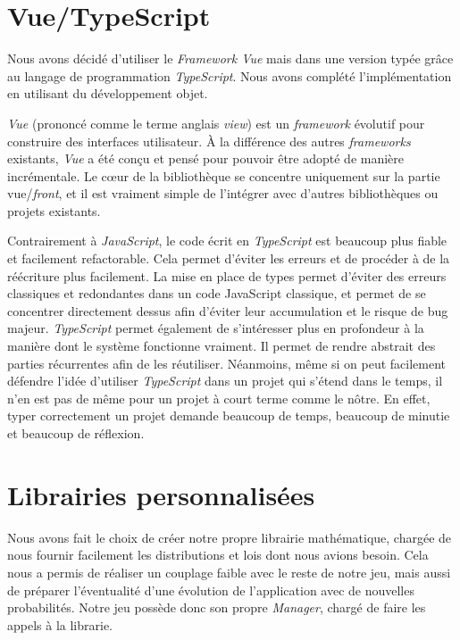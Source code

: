 \documentclass[a4paper, 12pt]{report}
\begin{document}
\section{Vue/TypeScript}

\tabto{1cm}Nous avons décidé d'utiliser le \textit{Framework Vue} mais dans une version typée grâce au
langage de programmation \textit{TypeScript}. Nous avons complété l'implémentation en utilisant du développement objet.

\vspace{0.5cm}

\tabto{1cm} \textit{Vue} (prononcé comme le terme anglais \textit{view}) est un \textit{framework} évolutif pour construire des
interfaces utilisateur. À la différence des autres \textit{frameworks} existants, \textit{Vue} a été conçu et pensé
pour pouvoir être adopté de manière incrémentale. Le cœur de la bibliothèque se concentre uniquement
sur la partie vue/\textit{front}, et il est vraiment simple de l’intégrer avec d’autres bibliothèques ou projets
existants.

\vspace{0.5cm}

\tabto{1cm} Contrairement à \textit{JavaScript}, le code écrit en \textit{TypeScript} est beaucoup plus fiable et facilement refactorable. 
Cela permet d'éviter les erreurs et de procéder à de la réécriture plus facilement.
La mise en place de types permet d'éviter des erreurs classiques et redondantes dans un code JavaScript classique,
et permet de se concentrer directement dessus afin d'éviter leur accumulation et le risque de bug majeur.
\tabto{1cm} \textit{TypeScript} permet également de s'intéresser plus en profondeur à la manière dont le système fonctionne vraiment.
Il permet de rendre abstrait des parties récurrentes afin de les réutiliser.
\tabto{1cm} Néanmoins, même si on peut facilement défendre l'idée d'utiliser \textit{TypeScript} dans un projet qui s'étend dans
le temps, il n'en est pas de même pour un projet à court terme comme le nôtre. En effet, typer correctement un projet
demande beaucoup de temps, beaucoup de minutie et beaucoup de réflexion.

\section{Librairies personnalisées}

\tabto{1cm} Nous avons fait le choix de créer notre propre librairie mathématique, chargée de nous fournir facilement les distributions et lois
dont nous avions besoin. Cela nous a permis de réaliser un couplage faible avec le reste de notre jeu, mais aussi de préparer
l'éventualité d'une évolution de l'application avec de nouvelles probabilités. Notre jeu possède donc son propre \textit{Manager}, chargé 
de faire les appels à la librarie.
\end{document}
